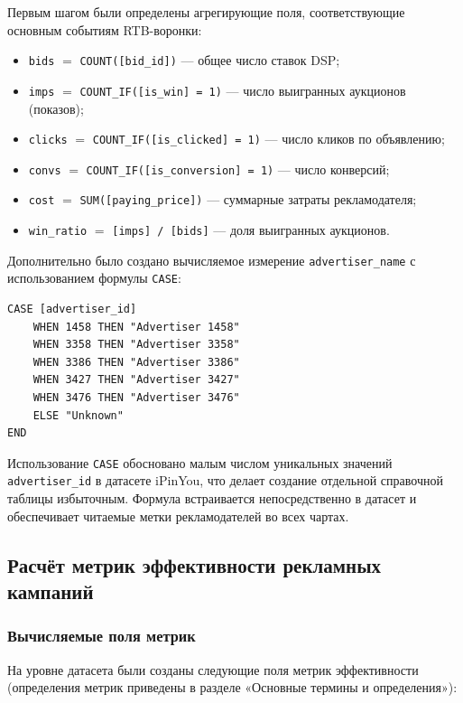 Первым шагом были определены агрегирующие поля, соответствующие основным событиям RTB-воронки:

\begin{itemize}
    \item \texttt{bids} $=$ \texttt{COUNT([bid\_id])} --- общее число ставок DSP;
    \item \texttt{imps} $=$ \texttt{COUNT\_IF([is\_win] = 1)} --- число выигранных аукционов (показов);
    \item \texttt{clicks} $=$ \texttt{COUNT\_IF([is\_clicked] = 1)} --- число кликов по объявлению;
    \item \texttt{convs} $=$ \texttt{COUNT\_IF([is\_conversion] = 1)} --- число конверсий;
    \item \texttt{cost} $=$ \texttt{SUM([paying\_price])} --- суммарные затраты рекламодателя;
    \item \texttt{win\_ratio} $=$ \texttt{[imps] / [bids]} --- доля выигранных аукционов.
\end{itemize}

Дополнительно было создано вычисляемое измерение \texttt{advertiser\_name} с использованием формулы \texttt{CASE}:

\begin{verbatim}
CASE [advertiser_id]
    WHEN 1458 THEN "Advertiser 1458"
    WHEN 3358 THEN "Advertiser 3358"
    WHEN 3386 THEN "Advertiser 3386"
    WHEN 3427 THEN "Advertiser 3427"
    WHEN 3476 THEN "Advertiser 3476"
    ELSE "Unknown"
END
\end{verbatim}

Использование \texttt{CASE} обосновано малым числом уникальных значений \texttt{advertiser\_id} в датасете iPinYou, что делает создание отдельной справочной таблицы избыточным. Формула встраивается непосредственно в датасет и обеспечивает читаемые метки рекламодателей во всех чартах.

\subsection{Расчёт метрик эффективности рекламных кампаний}
\label{subsec:datalens_metrics}

\subsubsection*{Вычисляемые поля метрик}

На уровне датасета были созданы следующие поля метрик эффективности (определения метрик приведены в разделе «Основные термины и определения»):

